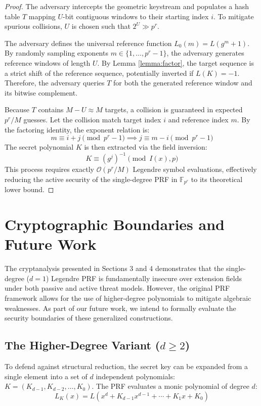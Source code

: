 \documentclass[runningheads]{llncs}
\begin{document}
\begin{proof}
The adversary intercepts the geometric keystream and populates a hash table $T$ mapping $U$-bit contiguous windows to their starting index $i$. To mitigate spurious collisions, $U$ is chosen such that $2^U \gg p^r$.

The adversary defines the universal reference function $L_0(m) = L(g^m + 1)$. By randomly sampling exponents $m \in \{1, \dots, p^r-1\}$, the adversary generates reference windows of length $U$. By Lemma \ref{lemma:factor}, the target sequence is a strict shift of the reference sequence, potentially inverted if $L(K) = -1$. Therefore, the adversary queries $T$ for both the generated reference window and its bitwise complement.

Because $T$ contains $M - U \approx M$ targets, a collision is guaranteed in expected $p^r/M$ guesses. Let the collision match target index $i$ and reference index $m$. By the factoring identity, the exponent relation is:
\begin{equation*}
    m \equiv i + j \pmod{p^r - 1} \implies j \equiv m - i \pmod{p^r - 1}
\end{equation*}
The secret polynomial $K$ is then extracted via the field inversion:
\begin{equation*}
    K \equiv (g^j)^{-1} \pmod{I(x), p}
\end{equation*}
This process requires exactly $\mathcal{O}(p^r/M)$ Legendre symbol evaluations, effectively reducing the active security of the single-degree PRF in $\mathbb{F}_{p^r}$ to its theoretical lower bound.
\end{proof}

\section{Cryptographic Boundaries and Future Work}
The cryptanalysis presented in Sections 3 and 4 demonstrates that the single-degree ($d=1$) Legendre PRF is fundamentally insecure over extension fields under both passive and active threat models. However, the original PRF framework \cite{khovratovich2019} allows for the use of higher-degree polynomials to mitigate algebraic weaknesses. As part of our future work, we intend to formally evaluate the security boundaries of these generalized constructions.

\subsection{The Higher-Degree Variant ($d \geq 2$)}
To defend against structural reduction, the secret key can be expanded from a single element into a set of $d$ independent polynomials: $K = (K_{d-1}, K_{d-2}, \dots, K_0)$. The PRF evaluates a monic polynomial of degree $d$:
\begin{equation*}
L_K(x) = L(x^d + K_{d-1}x^{d-1} + \cdots + K_1x + K_0)
\end{equation*}
\end{document}
